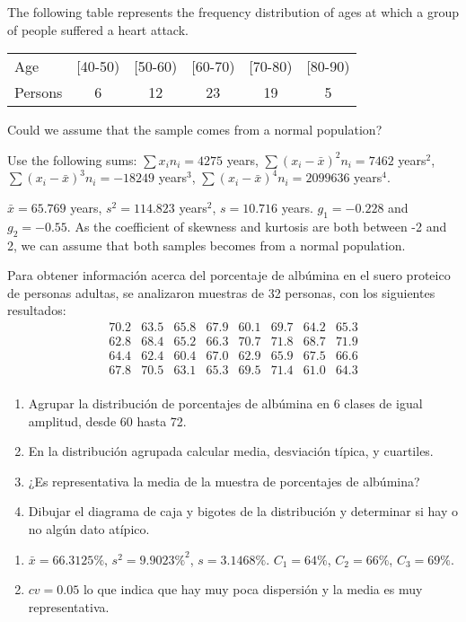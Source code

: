 {The following table represents the frequency distribution of ages at which a group of people suffered a heart attack.
\begin{center}
\begin{tabular}{lccccc}
\toprule
Age & [40-50) & [50-60) & [60-70) & [70-80) & [80-90)  \\
Persons & 6 & 12 & 23 & 19 & 5  \\
\bottomrule
\end{tabular}
\end{center}

Could we assume that the sample comes from a normal population?

Use the following sums: $\sum x_in_i= 4275$ years, $\sum (x_i-\bar x)^2n_i=7462$ years$^2$, $\sum (x_i-\bar x)^3n_i=-18249$ years$^3$, $\sum (x_i-\bar x)^4n_i=2099636$ years$^4$.
}
{
$\bar x= 65.769$ years, $s^2= 114.823$ years$^2$, $s=10.716$ years. $g_1=-0.228$ and $g_2=-0.55$.
As the coefficient of skewness and kurtosis are both between -2 and 2, we can assume that both samples becomes from a normal population.
}
{}


{Para obtener información acerca del porcentaje de albúmina en el suero proteico de personas adultas, se analizaron muestras de 32 personas, con los siguientes resultados:
\[
\begin{array}{cccccccc}
70.2 & 63.5 & 65.8 & 67.9 & 60.1 & 69.7 & 64.2 & 65.3 \\
62.8 & 68.4 & 65.2 & 66.3 & 70.7 & 71.8 & 68.7 & 71.9 \\
64.4 & 62.4 & 60.4 & 67.0 & 62.9 & 65.9 & 67.5 & 66.6 \\
67.8 & 70.5 & 63.1 & 65.3 & 69.5 & 71.4 & 61.0 & 64.3 \\
\end{array}
\]
\begin{enumerate}
\item Agrupar la distribución de porcentajes de albúmina en 6 clases de igual amplitud, desde 60 hasta 72.
\item En la distribución agrupada calcular media, desviación típica, y cuartiles.
\item ¿Es representativa la media de la muestra de porcentajes de albúmina?
\item Dibujar el diagrama de caja y bigotes de la distribución y determinar si hay o no algún dato atípico.
\end{enumerate}
}
{\begin{enumerate}[start=2]
\item $\bar x=66.3125\%$, $s^2=9.9023\%^2$, $s=3.1468\%$. $C_1=64\%$, $C_2=66\%$, $C_3=69\%$.
\item $cv=0.05$ lo que indica que hay muy poca dispersión y la media es muy representativa.
\end{enumerate}
}
{}



